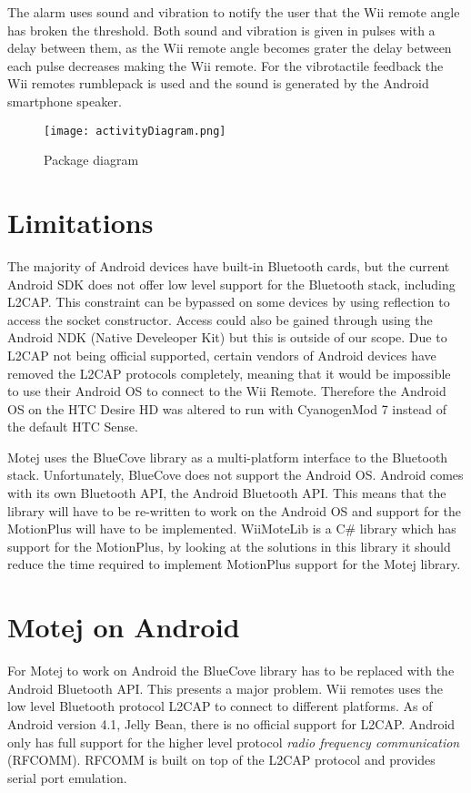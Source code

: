 The alarm uses sound and vibration to notify the user that the Wii remote angle has broken the threshold. Both sound and vibration is given in pulses with a delay between them, as the Wii remote angle becomes grater the delay between each pulse decreases making the Wii remote. For the vibrotactile feedback the Wii remotes rumblepack is used and the sound is generated by the Android smartphone speaker. 


\begin{figure}[h!]
  \centering
    \texttt{[image: activityDiagram.png]}
    \caption{\footnotesize Package diagram}
    \label{fig:activityDiagram}
\end{figure}


\section{Limitations}
The majority of Android devices have built-in Bluetooth cards, but the current Android SDK does not offer low level support for the Bluetooth stack, including L2CAP. This constraint can be bypassed on some devices by using reflection to access the socket constructor\cite{l2capHtc}. Access could also be gained through using the Android NDK (Native Develeoper Kit) but this is outside of our scope. Due to L2CAP not being official supported, certain vendors of Android devices have removed the L2CAP protocols completely, meaning that it would be impossible to use their Android OS to connect to the Wii Remote. Therefore the Android OS on the HTC Desire HD was altered to run with CyanogenMod 7 instead of the default HTC Sense.

Motej uses the BlueCove library as a multi-platform interface to the Bluetooth stack. Unfortunately, BlueCove does not support the Android OS. Android comes with its own Bluetooth API, the Android Bluetooth API. This means that the library will have to be re-written to work on the Android OS and support for the MotionPlus will have to be implemented. WiiMoteLib\cite{wiiMoteLib} is a C\# library which has support for the MotionPlus, by looking at the solutions in this library it should reduce the time required to implement MotionPlus support for the Motej library.

\section{Motej on Android}
For Motej to work on Android the BlueCove library has to be replaced with the Android Bluetooth API. This presents a major problem. Wii  remotes uses the low level Bluetooth protocol L2CAP to connect to different platforms. As of Android version 4.1, Jelly Bean, \cite{jellyBean} there is no official support for L2CAP. Android only has full support for the higher level protocol \emph{radio frequency communication} (RFCOMM). RFCOMM is built on top of the L2CAP protocol and provides serial port emulation. 

